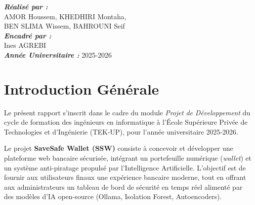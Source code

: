 \documentclass[12pt,a4paper]{report}
\begin{document}
\begin{titlepage}
    \vspace{1.5cm}

    \begin{center}
    \end{center}

    \vfill

    \begin{center}
        {\large\bfseries\itshape R\'ealis\'e par :}\\[6pt]
        {\normalsize AMOR Houssem, KHEDHIRI Montaha,}\\[2pt]
        {\normalsize BEN SLIMA Wissem, BAHROUNI Seif}\\[18pt]

        {\large\bfseries\itshape Encadr\'e par :}\\[6pt]
        {\normalsize Ines AGREBI}\\[18pt]

        {\large\bfseries\itshape Ann\'ee Universitaire :} {\normalsize 2025-2026}
    \end{center}

    \vspace{1cm}
    \restoregeometry
\end{titlepage}

\tableofcontents
\listoffigures
\listoftables
\newpage

\chapter*{Introduction Générale}

Le présent rapport s'inscrit dans le cadre du module \textit{Projet de Développement} du cycle de formation des ingénieurs en informatique à l'École Supérieure Privée de Technologies et d'Ingénierie (TEK-UP), pour l'année universitaire 2025-2026.

Le projet \textbf{SaveSafe Wallet (SSW)} consiste à concevoir et développer une plateforme web bancaire sécurisée, intégrant un portefeuille numérique (\textit{wallet}) et un système anti-piratage propulsé par l'Intelligence Artificielle. L'objectif est de fournir aux utilisateurs finaux une expérience bancaire moderne, tout en offrant aux administrateurs un tableau de bord de sécurité en temps réel alimenté par des modèles d'IA open-source (Ollama, Isolation Forest, Autoencoders).
\end{document}
